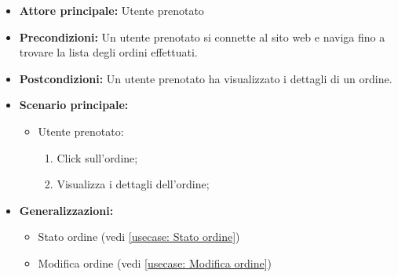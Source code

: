 \label{usecase:Dettaglio ordine}
\begin{itemize}
	\item \textbf{Attore principale:}  Utente prenotato
	\item \textbf{Precondizioni:}
	      Un utente prenotato si connette al sito web e naviga fino a trovare la
	      lista degli ordini effettuati.
	\item \textbf{Postcondizioni:}
	      Un utente prenotato ha visualizzato i dettagli di un ordine.
	\item \textbf{Scenario principale:}
	      \begin{itemize}
		      \item  Utente prenotato:
		            \begin{enumerate}
			            \item Click sull'ordine;
			            \item Visualizza i dettagli dell'ordine;
		            \end{enumerate}
	      \end{itemize}
	\item \textbf{Generalizzazioni:}
	      \begin{itemize}
		      \item  Stato ordine (vedi \autoref{usecase: Stato ordine})
		      \item  Modifica ordine (vedi \autoref{usecase: Modifica ordine})
	      \end{itemize}
\end{itemize}
